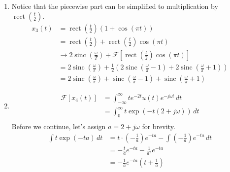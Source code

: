 \documentclass[12pt]{article}
\newcommand{\rect}{\operatorname{rect}}
\newcommand{\sinc}{\operatorname{sinc}}
\begin{document}
\begin{enumerate}
\begin{enumerate}
\begin{enumerate}
                              \item Notice that the piecewise part can be simplified to multiplication by $\rect\left(\frac{t}{2}\right)$.
                                    \begin{align*}
                                          x_3(t)
                                           & = \rect\left(\frac{t}{2}\right)(1+\cos(\pi t))                                                                                                 \\
                                           & = \rect\left(\frac{t}{2}\right)+\rect\left(\frac{t}{2}\right)\cos(\pi t)                                                                       \\
                                           & \rightarrow 2\sinc\left(\frac{\omega}{T}\right)+\mathcal{F}\left[\rect\left(\frac{t}{2}\right)\cos(\pi t)\right]                               \\
                                           & =2\sinc\left(\frac{\omega}{\pi}\right)+\frac{1}{2}\left(2\sinc\left(\frac{\omega}{\pi}-1\right)+2\sinc\left(\frac{\omega}{\pi}+1\right)\right) \\
                                           & =\boxed{2\sinc\left(\frac{\omega}{\pi}\right)+\sinc\left(\frac{\omega}{\pi}-1\right)+\sinc\left(\frac{\omega}{\pi}+1\right)}
                                    \end{align*}
                              \item \[\begin{aligned}
                                                \mathcal{F}[x_4(t)]
                                                 & = \int_{-\infty}^{\infty} te^{-2t}u(t)e^{-j\omega t}\,dt \\
                                                 & = \int_{0}^{\infty} t\exp(-t(2+j\omega))\,dt             \\
                                          \end{aligned}\]
                                    Before we continue, let's assign $a=2+j\omega$ for brevity.
                                    \begin{align*}
                                          \int t\exp(-ta)\,dt
                                          &= t \cdot \left(-\frac{1}{a}\right)e^{-ta}-\int \left(-\frac{1}{a}\right)e^{-ta}\,dt \\
                                          &= -\frac{t}{a}e^{-ta}-\frac{1}{a^2}e^{-ta} \\
                                          &= -\frac{1}{a}e^{-ta}\left(t+\frac{1}{a}\right)
                                    \end{align*}


\end{enumerate}
\end{enumerate}
\end{enumerate}
\end{document}
